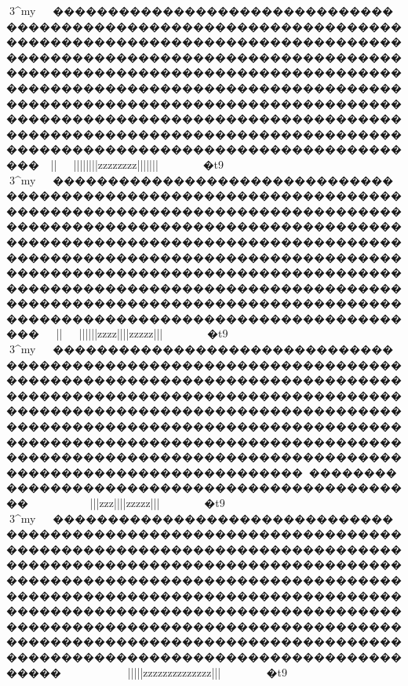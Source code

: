 {{{{{{{{{{{{{{{{{{{{{{{{{{{{{{{{{{{{{{{{{{{{{{{{{{{{{{{{{{{{{{{{{{{{{{{{{{{{{{{{{{{{{{{{{{{{{{{{{{{{{{{{{{{{{{{{{{{{{{{{{{{{{{{{{{{{{{{{{{{{{{{{{{{{{{{{{{{{{{{{{{{{{{{{{{{{{{{{{{{{{{{{{{{{{{{{{{{{{{{{{{{{{{{{{{{{{{{{{{{{{{{{{{{{{{{{{{{{{{{{{{{{{{{{{{{{{{{{{{{{{{{{{{{{{{{{{{{{{{{{{{{{{{{{{{{{{{{{{{{{{{{{{{{{{{{{{{{{{{{{{{{{{{{{{{{{{{{{{{{{{{{{{{{{{{{{{{{{{{{{{{{{{{{{{{{{{{{{{{{{{{{{{{{{{{{{{{{{{{{{{{{{{{{{{{{{{{{{{{{{{{{{{{{{{{{{{{{{{{{{{{{{{{{{{{{{{{{{{{{{{{{{{{{{{{{{{{{{{{{{{{{{{{{{{{{{{{{{{{{{{{{{{{{{{{{{{{{{{{{{{{{{{{{{{{{{{{{{{{{{{{{{{{{{{{{{{{{{{{{{{{{{{{{{{{{{{{{{{{{{{{{{{{{{{{{{{{{{{{{{{{{{{{{{{{{{{{{{{{{{{{{{{{{{{{{{3^my{}~~����������������������������������������������������������������������������������������������������������������������������������������������������������������������������������������������������������������������������������������������������������������������������������������������������������������������������������������������������������������������~}}}||}}}~~~}}}}||||||||{{{{{{{{{{{{{{{{zzzzzzzz{{{{||||{{{{{{{{{{{{{{{{{|||}}}}}}}}~~~~~~~}}}�t9

3^my{}~~����������������������������������������������������������������������������������������������������������������������������������������������������������������������������������������������������������������������������������������������������������������������������������������������������������������������������������������������������������������������~~}}||}}}~~~}}}}|||}}}}|{{{{{{{{{{{{{{{{||{{zzzz{{{{||||{{{{{{{{{zzzzz{{{|||}}}}}}}}~~~~~~~}}}�t9

3^my{}~~��������������������������������������������������������������������������������������������������������������������������������������������������������������������������������������������������������������������������������������������������������������������������������������������������������������������������������������������������������������������~~}}~~~~~~}}}}}}}}}}~}|{{{{{{{{{{{{{{{||{{{zzz{{{{||||{{{{{{{{{zzzzz{{{|||}}}}}}}}~~~~~~~}}}�t9

3^my{}~~������������������������������������������������������������������������������������������������������������������������������������������������������������������������������������������������������������������������������������������������������������������������������������������������������������������������������������������������������������������������~~~}}}~~~~}}}}}}}~~~~}|{{{{{{{{{{{{{{{||||{{{{zzzz{{{{{{{{{{zzzzzzzzzz{{{{|||}}}~~~~~}}}�t9

}}}}}}}}}}}}}}}}}}}}}}}}}}}}}}}}}}}}}}}}}}}}}}}}}}}}}}}}}}}}}}}}}}}}}}}}}}}}}}}}}}}}}}}}}}}}}}}}}}}}}}}}}}}}}}}}}}}}}}}}}}}}}}}}}}}}}}}}}}}}}}}}}}}}}}}}}}}}}}}}}}}}}}}}}}}}}}}}}}}}}}}}}}}}}}}}}}}}}}}}}}}}}}}}}}}}}}}}}}}}}}}}}}}}}}}}}}}}}}}}}}}}}}}}}}}}}}}}}}}}}}}}}}}}}}}}}}}}}}}}}}}}}}}}}}}}}}}}}}}}}}}}}}}}}}}}}}}}}}}}}}}}}}}}}}}}}}}}}}}}}}}}}}}}}}}}}}}}}}}}}}}}}}}}}}}}}}}}}}}}}}}}}}}}}}}}}}}}}}}}}}}}}}}}}}}}}}}}}}}}}}}}}}}}}}}}}}}}}}}}}}}}}}}}}}}}}}}}}}}}}}}}}}}}}}}}}}}}}}}}}}}}}}}}}}}}}}}}}}}}}}}}}}}}}}}}}}}}}}}}}}}}}}}}}}}}}}}}}}}}}}}}}}}}}}}}}}}}}}}}}}}}}}}}}}}}}}}}}}}}}}}}}}}}}}}}}}}}}}}}}}}}}}}}}}}}}}}}}}}}}}}}}}}}}}}}}}}}}}}}}}}}}}}}}}}}}}}}}}}}}}}}}}}}}}}}}}}}}}}}}}}}
